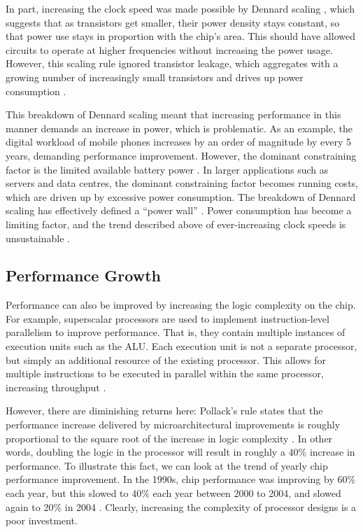\documentclass[bsc,frontabs,singlespacing,parskip,deptreport]{infthesis}     %
\begin{document}
In part, increasing the clock speed was made possible by Dennard scaling \cite{dennard_1999}, which suggests that as transistors get smaller, their power density stays constant, so that power use stays in proportion with the chip's area. This should have allowed circuits to operate at higher frequencies without increasing the power usage. However, this scaling rule ignored transistor leakage, which aggregates with a growing number of increasingly small transistors and drives up power consumption \cite{bohr_2007}.

This breakdown of Dennard scaling meant that increasing performance in this manner demands an increase in power, which is problematic. As an example, the digital workload of mobile phones increases by an order of magnitude by every 5 years, demanding performance improvement. However, the dominant constraining factor is the limited available battery power \cite{berkel_2009}. In larger applications such as servers and data centres, the dominant constraining factor becomes running costs, which are driven up by excessive power consumption. The breakdown of Dennard scaling has effectively defined a “power wall” \cite{patterson-hennessy}. Power consumption has become a limiting factor, and the trend described above of ever-increasing clock speeds is unsustainable \cite{blake_2009}.

\subsection{Performance Growth} \label{performance-growth}
Performance can also be improved by increasing the logic complexity on the chip. For example, superscalar processors are used to implement instruction-level parallelism to improve performance. That is, they contain multiple instances of execution units such as the ALU. Each execution unit is not a separate processor, but simply an additional resource of the existing processor. This allows for multiple instructions to be executed in parallel within the same processor, increasing throughput \cite{stallings}.

However, there are diminishing returns here: Pollack’s rule states that the performance increase delivered by microarchitectural improvements is roughly proportional to the square root of the increase in logic complexity \cite{borkar_2007}. In other words, doubling the logic in the processor will result in roughly a 40\% increase in performance. To illustrate this fact, we can look at the trend of yearly chip performance improvement. In the 1990s, chip performance was improving by 60\% each year, but this slowed to 40\% each year between 2000 to 2004, and slowed again to 20\% in 2004 \cite{geer_2005}. Clearly, increasing the complexity of processor designs is a poor investment.
\end{document}
